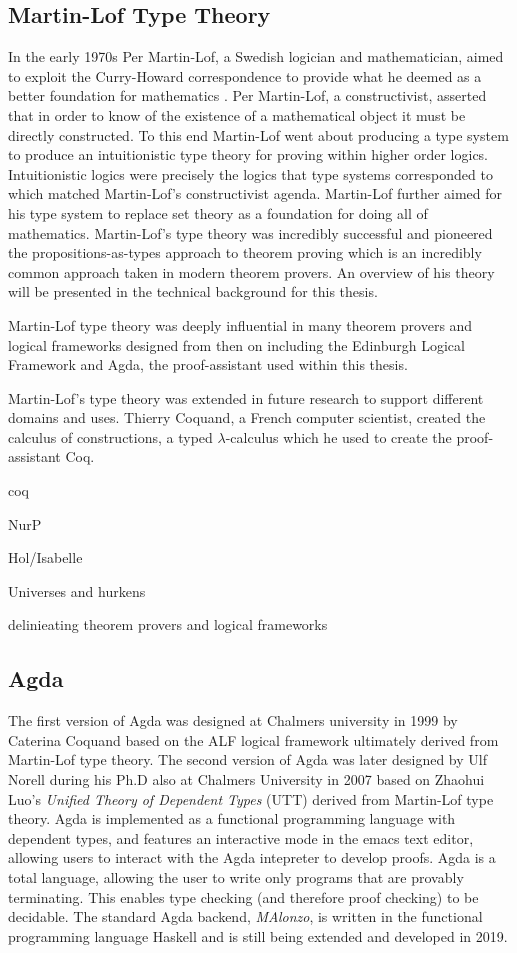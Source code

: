 \subsection{Martin-Lof Type Theory}
In the early 1970s Per Martin-Lof, a Swedish logician and mathematician, aimed
to exploit the Curry-Howard correspondence to provide what he deemed as a better
foundation for mathematics \cite{martin1984intuitionistic}. Per Martin-Lof, a constructivist, asserted that in
order to know of the existence of a mathematical object it must be directly
constructed. To this end Martin-Lof went about producing a type system to
produce an intuitionistic type theory for proving within higher order logics.
Intuitionistic logics were precisely the logics that type systems corresponded
to which matched Martin-Lof's constructivist agenda. Martin-Lof further aimed
for his type system to replace set theory as a foundation for doing all of
mathematics. Martin-Lof's type theory was incredibly successful and pioneered
the propositions-as-types approach to theorem proving which is an incredibly
common approach taken in modern theorem provers. An overview of his theory will
be presented in the technical background for this thesis.

Martin-Lof type theory was deeply influential in many theorem provers and
logical frameworks designed from then on including the Edinburgh Logical
Framework and  Agda, the proof-assistant used within this thesis.

Martin-Lof's type theory was extended in future research to support different
domains and uses. Thierry Coquand, a French computer scientist, created the
calculus of constructions, a typed $\lambda$-calculus which he used to create
the proof-assistant Coq.

coq

NurP

Hol/Isabelle

Universes and hurkens

delinieating theorem provers and logical frameworks

\subsection{Agda}
The first version of Agda was designed at Chalmers university in 1999 by
Caterina Coquand \cite{coquand2000agda} based on the ALF logical framework
\cite{magnusson1993alf} ultimately derived from
Martin-Lof type theory. The second version of Agda was later designed by Ulf
Norell during his Ph.D also at Chalmers University in 2007
\cite{norell2007towards} based on Zhaohui Luo's
\textit{Unified Theory of Dependent Types} (UTT)  \cite{luo1992unifying} derived from Martin-Lof type
theory. Agda is implemented as a functional programming language with dependent
types, and features an interactive mode in the emacs text editor, allowing users
to interact with the Agda intepreter to develop proofs. Agda is a total
language, allowing the user to write only programs that are provably
terminating. This enables type checking (and therefore proof checking) to be
decidable. The standard Agda backend, \textit{MAlonzo}, is written in the
functional programming language Haskell and is still being extended and
developed in 2019.
